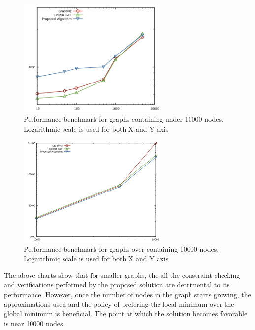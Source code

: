 \begin{figure}[ht] \centering
\includegraphics[width=0.65\textwidth]{img/results/under10000.png}
\caption{Performance benchmark for graphs containing under 10000 nodes. Logarithmic scale is used for both X and Y axis} \end{figure}

\begin{figure}[ht] \centering
\includegraphics[width=0.65\textwidth]{img/results/over10000.png}
\caption{Performance benchmark for graphs over containing 10000 nodes. Logarithmic scale is used for both X and Y axis} \end{figure}

The above charts show that for smaller graphs, the all the constraint checking and verifications performed 
by the proposed solution are detrimental to its performance. However, once the number of nodes in the graph starts 
growing, the approximations used and the policy of prefering the local minimum over the global minimum is beneficial.
The point at which the solution becomes favorable is near 10000 nodes.
